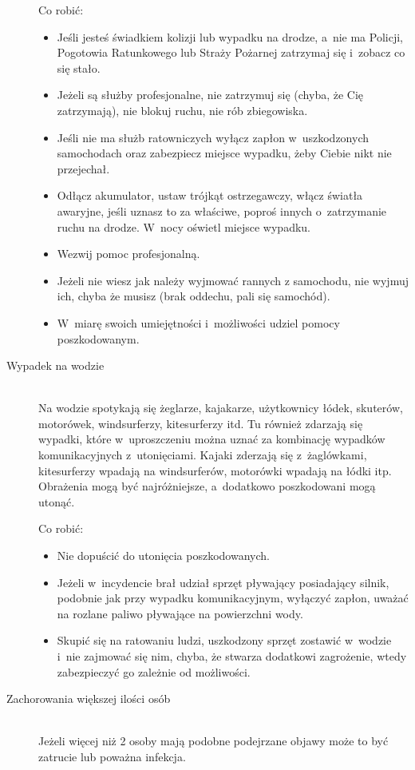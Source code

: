 \documentclass[a5paper,10pt,titlepage,twoside]{article}
\begin{document}
\begin{description}
Co robić:
\begin{itemize}
\item Jeśli jesteś świadkiem kolizji lub wypadku na drodze, a~nie ma Policji, Pogotowia Ratunkowego lub Straży Pożarnej zatrzymaj się i~zobacz co się stało.
\item Jeżeli są służby profesjonalne, nie zatrzymuj się (chyba, że Cię zatrzymają), nie blokuj ruchu, nie rób zbiegowiska.
\item Jeśli nie ma służb ratowniczych wyłącz zapłon w~uszkodzonych samochodach oraz zabezpiecz miejsce wypadku, żeby Ciebie nikt nie przejechał.
\item Odłącz akumulator, ustaw trójkąt ostrzegawczy, włącz światła awaryjne, jeśli uznasz to za właściwe, poproś innych o~zatrzymanie ruchu na drodze. W~nocy oświetl miejsce wypadku.
\item Wezwij pomoc profesjonalną.
\item Jeżeli nie wiesz jak należy wyjmować rannych z samochodu, nie wyjmuj ich, chyba że musisz (brak oddechu, pali się samochód).
\item W~miarę swoich umiejętności i~możliwości udziel pomocy poszkodowanym.
\end{itemize}
\item[Wypadek na wodzie] \hfill \\ Na wodzie spotykają się żeglarze, kajakarze, użytkownicy łódek, skuterów, motorówek, windsurferzy, kitesurferzy itd. Tu również zdarzają się wypadki, które w~uproszczeniu można uznać za kombinację wypadków komunikacyjnych z~utonięciami. Kajaki zderzają się z~żaglówkami, kitesurferzy wpadają na windsurferów, motorówki wpadają na łódki itp. Obrażenia mogą być najróżniejsze, a~dodatkowo poszkodowani mogą utonąć.

Co robić:
\begin{itemize}
\item Nie dopuścić do utonięcia poszkodowanych.
\item Jeżeli w~incydencie brał udział sprzęt pływający posiadający silnik, podobnie jak przy wypadku komunikacyjnym, wyłączyć zapłon, uważać na rozlane paliwo pływające na powierzchni wody.
\item Skupić się na ratowaniu ludzi, uszkodzony sprzęt zostawić w~wodzie i~nie zajmować się nim, chyba, że stwarza dodatkowi zagrożenie, wtedy zabezpieczyć go zależnie od możliwości.
\end{itemize}
\item[Zachorowania większej ilości osób] \hfill \\ Jeżeli więcej niż 2 osoby mają podobne podejrzane objawy może to być zatrucie lub poważna infekcja.


\end{description}
\end{document}
